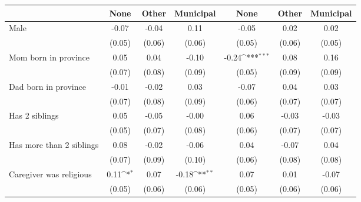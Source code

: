 {
\def\sym#1{\ifmmode^{#1}\else\(^{#1}\)\fi}
\begin{tabular}{l*{6}{c}}
\toprule
                    &\multicolumn{1}{c}{None}&\multicolumn{1}{c}{Other}&\multicolumn{1}{c}{Municipal}&\multicolumn{1}{c}{None}&\multicolumn{1}{c}{Other}&\multicolumn{1}{c}{Municipal}\\
\midrule
Male                &       -0.07         &       -0.04         &        0.11         &       -0.05         &        0.02         &        0.02         \\
                    &      (0.05)         &      (0.06)         &      (0.06)         &      (0.05)         &      (0.06)         &      (0.05)         \\
\addlinespace
Mom born in province&        0.05         &        0.04         &       -0.10         &       -0.24\sym{***}&        0.08         &        0.16         \\
                    &      (0.07)         &      (0.08)         &      (0.09)         &      (0.05)         &      (0.09)         &      (0.09)         \\
\addlinespace
Dad born in province&       -0.01         &       -0.02         &        0.03         &       -0.07         &        0.04         &        0.03         \\
                    &      (0.07)         &      (0.08)         &      (0.09)         &      (0.06)         &      (0.07)         &      (0.07)         \\
\addlinespace
Has 2 siblings      &        0.05         &       -0.05         &       -0.00         &        0.06         &       -0.03         &       -0.03         \\
                    &      (0.05)         &      (0.07)         &      (0.08)         &      (0.06)         &      (0.07)         &      (0.07)         \\
\addlinespace
Has more than 2 siblings&        0.08         &       -0.02         &       -0.06         &        0.04         &       -0.07         &        0.04         \\
                    &      (0.07)         &      (0.09)         &      (0.10)         &      (0.06)         &      (0.08)         &      (0.08)         \\
\addlinespace
Caregiver was religious&        0.11\sym{*}  &        0.07         &       -0.18\sym{**} &        0.07         &        0.01         &       -0.07         \\
                    &      (0.05)         &      (0.06)         &      (0.06)         &      (0.05)         &      (0.06)         &      (0.06)         \\

\end{tabular}}
